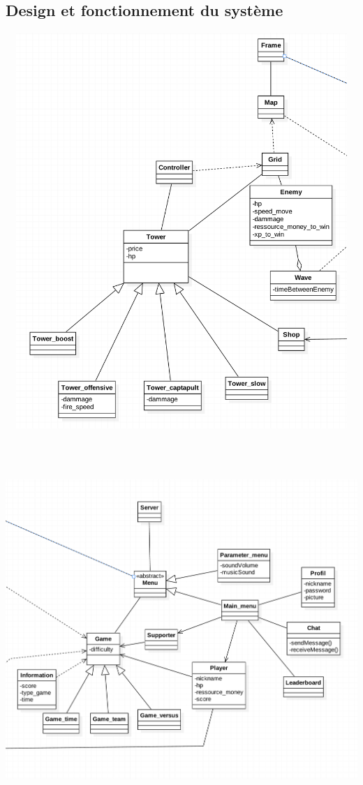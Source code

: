 \documentclass[10pt,a4paper]{article}
\begin{document}
\subsection{Design et fonctionnement du système}
  \includegraphics[height=15cm,width=15cm]{Class_ingame.png}
	\includegraphics[height=15cm,width=15cm]{Class_menu.png}
\newpage

\printindex
\end{document}
